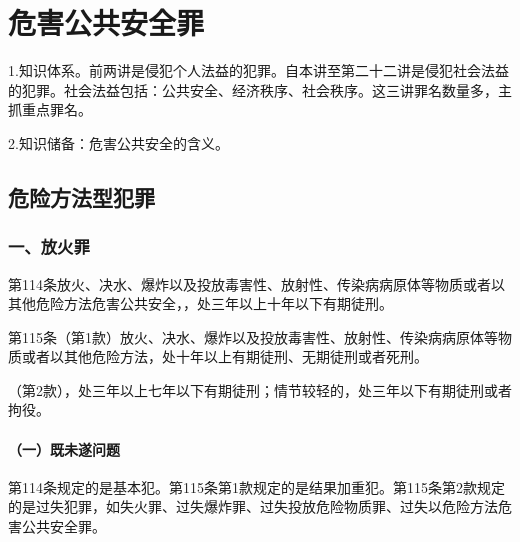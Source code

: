 \chapter{危害公共安全罪}

\begin{EditionOpeningPanel}
1.知识体系。前两讲是侵犯个人法益的犯罪。自本讲至第二十二讲是侵犯社会法益的犯罪。社会法益包括：公共安全、经济秩序、社会秩序。这三讲罪名数量多，主抓重点罪名。

2.知识储备：危害公共安全的含义。

\end{EditionOpeningPanel}


\section{危险方法型犯罪}

\subsection*{一、放火罪}

第114条放火、决水、爆炸以及投放毒害性、放射性、传染病病原体等物质或者以其他危险方法危害公共安全，，处三年以上十年以下有期徒刑。

第115条（第1款）放火、决水、爆炸以及投放毒害性、放射性、传染病病原体等物质或者以其他危险方法，处十年以上有期徒刑、无期徒刑或者死刑。

（第2款），处三年以上七年以下有期徒刑；情节较轻的，处三年以下有期徒刑或者拘役。

\subsubsection*{（一）既未遂问题}

第114条规定的是基本犯。第115条第1款规定的是结果加重犯。第115条第2款规定的是过失犯罪，如失火罪、过失爆炸罪、过失投放危险物质罪、过失以危险方法危害公共安全罪。

